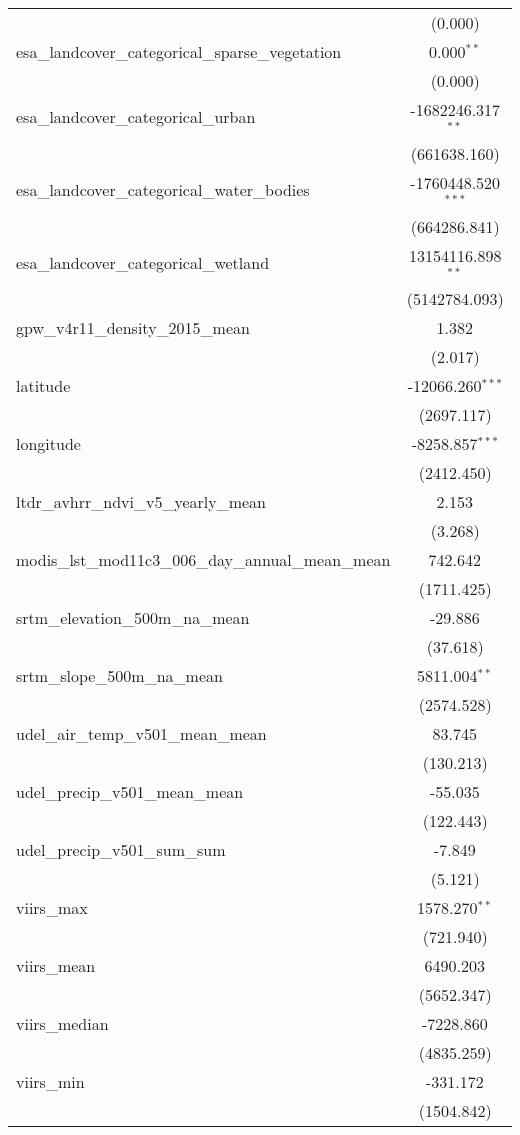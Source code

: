 \begin{table}[!htbp]
\begin{tabular}{@{\extracolsep{5pt}}lc}
  & (0.000) \\
 esa_landcover_categorical_sparse_vegetation & 0.000$^{**}$ \\
  & (0.000) \\
 esa_landcover_categorical_urban & -1682246.317$^{**}$ \\
  & (661638.160) \\
 esa_landcover_categorical_water_bodies & -1760448.520$^{***}$ \\
  & (664286.841) \\
 esa_landcover_categorical_wetland & 13154116.898$^{**}$ \\
  & (5142784.093) \\
 gpw_v4r11_density_2015_mean & 1.382$^{}$ \\
  & (2.017) \\
 latitude & -12066.260$^{***}$ \\
  & (2697.117) \\
 longitude & -8258.857$^{***}$ \\
  & (2412.450) \\
 ltdr_avhrr_ndvi_v5_yearly_mean & 2.153$^{}$ \\
  & (3.268) \\
 modis_lst_mod11c3_006_day_annual_mean_mean & 742.642$^{}$ \\
  & (1711.425) \\
 srtm_elevation_500m_na_mean & -29.886$^{}$ \\
  & (37.618) \\
 srtm_slope_500m_na_mean & 5811.004$^{**}$ \\
  & (2574.528) \\
 udel_air_temp_v501_mean_mean & 83.745$^{}$ \\
  & (130.213) \\
 udel_precip_v501_mean_mean & -55.035$^{}$ \\
  & (122.443) \\
 udel_precip_v501_sum_sum & -7.849$^{}$ \\
  & (5.121) \\
 viirs_max & 1578.270$^{**}$ \\
  & (721.940) \\
 viirs_mean & 6490.203$^{}$ \\
  & (5652.347) \\
 viirs_median & -7228.860$^{}$ \\
  & (4835.259) \\
 viirs_min & -331.172$^{}$ \\
  & (1504.842) \\

\end{tabular}
\end{table}
